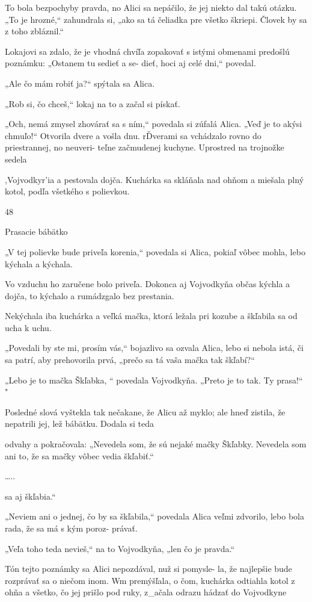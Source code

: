 \documentclass[12pt]{article}
\begin{document}
\begin{Parallel}[p]{}{}
{{To bola bezpochyby pravda, no Alici sa nepáčilo, že jej
niekto dal takú otázku. „To je hrozné,“ zahundrala si, „ako
sa tá čeliadka pre všetko škriepi. Človek by sa z toho
zbláznil.“

Lokajovi sa zdalo, že je vhodná chvíľa zopakovať s istými
obmenami predošlú poznámku: „Ostanem tu sedieť a se-
dieť, hoci aj celé dni,“ povedal.

„Ale čo mám robiť ja?“ spýtala sa Alica.

„Rob si, čo chceš,“ lokaj na to a začal si pískať.

„Och, nemá zmysel zhovárať sa s ním,“ povedala si zúfalá
Alica. „Veď je to akýsi chmuľo!“ Otvorila dvere a vošla
dnu.
rĎverami sa vchádzalo rovno do priestrannej, no neuveri-
teľne začmudenej kuchyne. Uprostred na trojnožke sedela

,Vojvodkyr'ia a pestovala dojča. Kuchárka sa skláňala nad
ohňom a miešala plný kotol, podľa všetkého s polievkou.

48

Prasacie bábätko

„V tej polievke bude priveľa korenia,“ povedala si Alica,
pokiaľ vôbec mohla, lebo kýchala a kýchala.

Vo vzduchu ho zaručene bolo priveľa. Dokonca aj
Vojvodkyňa občas kýchla a dojča, to kýchalo a rumádzgalo
bez prestania.

Nekýchala iba kuchárka a veľká mačka, ktorá ležala pri
kozube a škľabila sa od ucha k uchu.

„Povedali by ste mi, prosím vás,“ bojazlivo sa ozvala
Alica, lebo si nebola istá, či sa patrí, aby prehovorila prvá,
„prečo sa tá vaša mačka tak škľabí?“

„Lebo je to mačka Škľabka, “ povedala Vojvodkyňa.
„Preto je to tak. Ty prasa!“ "

Posledné slová vyštekla tak nečakane, že Alicu až myklo;
ale hneď zistila, že nepatrili jej, lež bábätku. Dodala si teda

odvahy a pokračovala:
„Nevedela som, že sú nejaké mačky Škľabky. Nevedela
som ani to, že sa mačky vôbec vedia škľabiť.“

…..

sa aj škľabia.“

„Neviem ani o jednej, čo by sa škľabila,“ povedala Alica
veľmi zdvorilo, lebo bola rada, že sa má s kým poroz-
právať.

„Veľa toho teda nevieš,“ na to Vojvodkyňa, „len čo je
pravda.“

Tón tejto poznámky sa Alici nepozdával, nuž si pomysle-
la, že najlepšie bude rozprávať sa o niečom inom. Wm
premýšľala, o čom, kuchárka odtiahla kotol z ohňa a všetko,
čo jej prišlo pod ruky, z_ačala odrazu hádzať do Vojvodkyne

}}
\end{Parallel}
\end{document}
